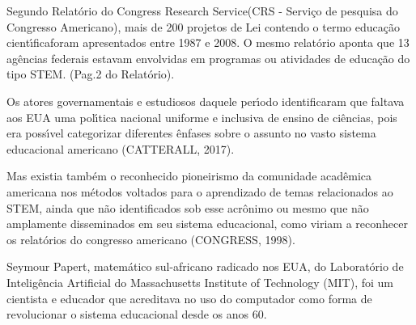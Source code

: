\documentclass[
12pt,		%
openright,	%
twoside,  %
a4paper,			%
chapter=TITLE,		%
english,			%
french,				%
spanish,			%
brazil				%
]{USPSC-classe/USPSC}
\begin{document}
Segundo Relat\'orio do \textquotedbl Congress Research Service\textquotedbl  (CRS - Servi\c{c}o de pesquisa do Congresso Americano), mais de 200 projetos de Lei contendo o termo \textquotedbl educa\c{c}\~ao cient\'{\i}fica\textquotedbl  foram apresentados entre 1987 e 2008. O mesmo relat\'orio aponta que 13 ag\^encias federais estavam envolvidas em programas ou atividades de educa\c{c}\~ao do tipo \textquotedbl STEM\textquotedbl . (Pag.2 do Relat\'orio).

















Os atores governamentais e estudiosos daquele per\'{\i}odo identificaram que faltava aos EUA uma pol\'{\i}tica nacional uniforme e inclusiva de ensino de ci\^encias, pois era poss\'{\i}vel categorizar diferentes \^enfases sobre o assunto no vasto sistema educacional americano  (CATTERALL, 2017).

















Mas existia tamb\'em o reconhecido pioneirismo da comunidade acad\^emica americana nos m\'etodos voltados para o aprendizado de temas relacionados ao STEM, ainda que n\~ao identificados sob esse acr\^onimo ou mesmo que n\~ao amplamente disseminados em seu sistema educacional, como viriam a reconhecer os relat\'orios do congresso americano  (CONGRESS, 1998).

















Seymour Papert, matem\'atico sul-africano radicado nos EUA, do Laborat\'orio de Intelig\^encia Artificial do Massachusetts Institute of Technology (MIT), foi um  cientista e educador que acreditava  no  uso do computador como forma de revolucionar o sistema  educacional  desde os anos 60.
\end{document}

